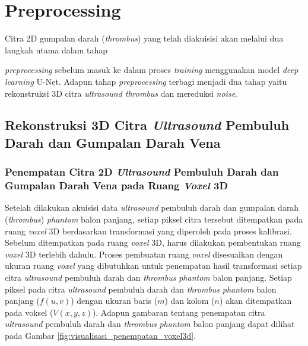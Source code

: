 \section{Preprocessing}
Citra 2D gumpalan darah (\textit{thrombus}) yang telah diakuisisi akan melalui dua langkah utama dalam tahap {\textit{preprocessing} sebelum masuk ke dalam proses \textit{training} menggunakan model \textit{deep learning} U-Net. Adapun tahap \textit{preprocessing} terbagi menjadi dua tahap yaitu rekonstruksi 3D citra \textit{ultrasound thrombus} dan mereduksi \textit{noise}. 
	

\subsection{Rekonstruksi 3D Citra \textit{Ultrasound} Pembuluh Darah dan Gumpalan Darah Vena}
\subsubsection{Penempatan Citra 2D \textit{Ultrasound} Pembuluh Darah dan Gumpalan Darah Vena pada Ruang \textit{Voxel} 3D}

Setelah dilakukan akuisisi data \textit{ultrasound} pembuluh darah dan gumpalan darah (\textit{thrombus}) \textit{phantom} balon panjang, setiap piksel citra tersebut ditempatkan pada ruang \textit{voxel} 3D berdasarkan transformasi yang diperoleh pada proses kalibrasi. Sebelum ditempatkan pada ruang \textit{voxel} 3D, harus dilakukan pembentukan ruang \textit{voxel} 3D terlebih dahulu. Proses pembuatan ruang \textit{voxel} disesuaikan dengan ukuran ruang \textit{voxel} yang dibutuhkan untuk penempatan hasil transformasi setiap citra \textit{ultrasound} pembuluh darah dan \textit{thrombus} \textit{phantom} balon panjang. Setiap piksel pada citra \textit{ultrasound} pembuluh darah dan \textit{thrombus} \textit{phantom} balon panjang ($f(u,v)$) dengan ukuran baris ($m$) dan kolom ($n$) akan ditempatkan pada voksel ($V(x,y,z)$). Adapun gambaran tentang penempatan citra \textit{ultrasound} pembuluh darah dan \textit{thrombus} \textit{phantom} balon panjang dapat dilihat pada Gambar \ref{fig:visualisasi_penempatan_voxel3d}. 

}
